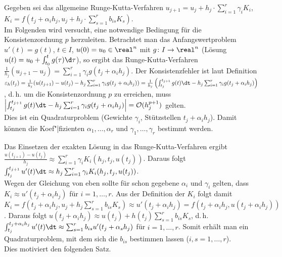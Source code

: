 \begin{Bem}
    Gegeben sei das allgemeine Runge-Kutta-Verfahren
    $u_{j+1} = u_j + h_j \cdot \sum_{i=1}^r \gamma_i K_i$,\\
    $K_i = f(t_j + \alpha_i h_j, u_j + h_j \cdot \sum_{s=1}^r b_{is} K_s)$.\\
    Im Folgenden wird versucht, eine notwendige Bedingung für die
    Konsistenzordnung $p$ herzuleiten.
    Betrachtet man das Anfangswertproblem $u'(t) = g(t)$, $t \in I$,
    $u(0) = u_0 \in \real^n$ mit $g\colon I \rightarrow \real^n$
    (Lösung $u(t) = u_0 + \int_{t_0}^t g(\tau)\d\tau$), so
    ergibt das Runge-Kutta-Verfahren\\
    $\frac{1}{h_j} (u_{j+1} - u_j) =
    \sum_{i=1}^r \gamma_i g(t_j + \alpha_i h_j)$.
    Der Konsistenzfehler ist laut Definition\\
    $\varepsilon_h(t_j) = \frac{1}{h_j} (u(t_{j+1}) - u(t_j) -
    h_j \sum_{i=1}^r \gamma_i g(t_j + \alpha_i h_j)) =
    \frac{1}{h_j} \left(\int_{t_j}^{t_{j+1}} g(t)\dt -
    h_j \sum_{i=1}^r \gamma_i g(t_j + \alpha_i h_j)\right)$, d.\,h. um die
    Konsistenzordnung $p$ zu erreichen, muss\\
    $\left|\int_{t_j}^{t_{j+1}} g(t)\dt -
    h_j \sum_{i=1}^r \gamma_i g(t_j + \alpha_i h_j)\right| = \O(h_j^{p+1})$
    gelten.\\
    Dies ist ein Quadraturproblem (Gewichte $\gamma_i$,
    Stützstellen $t_j + \alpha_i h_j$).
    Damit können die Koef"|fizienten $\alpha_1, \dotsc, \alpha_r$ und
    $\gamma_1, \dotsc, \gamma_r$ bestimmt werden.
\end{Bem}

\begin{Bem}
    Das Einsetzen der exakten Lösung in das Runge-Kutta-Verfahren ergibt\\
    $\frac{u(t_{j+1}) - u(t_j)}{h_j} \approx
    \sum_{i=1}^r \gamma_i K_i(h_j, t_j, u(t_j))$.
    Daraus folgt
    $\int_{t_j}^{t_{j+1}} u'(t)\dt \approx
    h_j \sum_{i=1}^r \gamma_i K_i(h_j, t_j, u(t_j))$.\\
    Wegen der Gleichung von eben sollte für schon gegebene $\alpha_i$ und
    $\gamma_i$ gelten, dass $K_i \approx u'(t_j + \alpha_i h_j)$
    für $i = 1, \dotsc, r$.
    Aus der Definition der $K_i$ folgt damit
    $K_i = f(t_j + \alpha_i h_j, u_j + h_j \sum_{s=1}^r b_{is} K_s)
    \approx u'(t_j + \alpha_i h_j) =
    f(t_j + \alpha_i h_j, u(t_j + \alpha_i h_j))$.
    Daraus folgt $u(t_j + \alpha_i h_j) \approx
    u(t_j) + h(t_j) \sum_{s=1}^r b_{is} K_s$, d.\,h.
    $\int_{t_j}^{t_j + \alpha_i h_j} u'(t)\dt \approx
    \sum_{s=1}^r b_{is} u'(t_j + \alpha_s h_j)$ für $i = 1, \dotsc, r$.
    Somit erhält man ein Quadraturproblem, mit dem sich die
    $b_{is}$ bestimmen lassen ($i, s = 1, \dotsc, r$).\\
    Dies motiviert den folgenden Satz.
\end{Bem}

